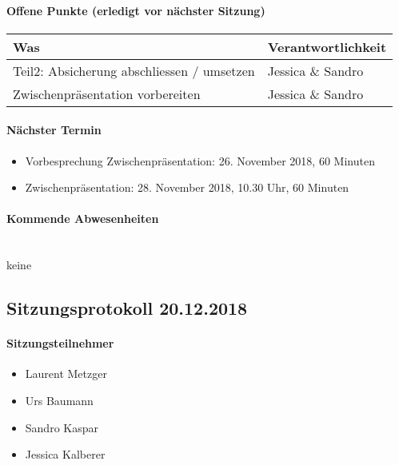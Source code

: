 \paragraph{Offene Punkte (erledigt vor nächster Sitzung)} \mbox{}
\begin{table}[H]
	\centering
	\begin{tabularx}{\textwidth}{X | p{4.5cm}}
		\rowcolor{gray!50}
		\textbf{Was} & \textbf{Verantwortlichkeit} \\
		\hline	
		Teil2: Absicherung abschliessen / umsetzen & Jessica \& Sandro \\
		Zwischenpräsentation vorbereiten & Jessica \& Sandro \\
	\end{tabularx}
	\label{tab:my-label}
\end{table}

\paragraph{Nächster Termin}
\begin{itemize}	
	\item Vorbesprechung Zwischenpräsentation: 26. November 2018, 60 Minuten
	\item Zwischenpräsentation: 28. November 2018, 10.30 Uhr, 60 Minuten
\end{itemize}

\paragraph{Kommende Abwesenheiten} \mbox{}\\
keine


\newpage






\subsection{Sitzungsprotokoll 20.12.2018}

\paragraph{Sitzungsteilnehmer}
\begin{itemize}	
	\item Laurent Metzger
	\item Urs Baumann
	\item Sandro Kaspar
	\item Jessica Kalberer
\end{itemize}

